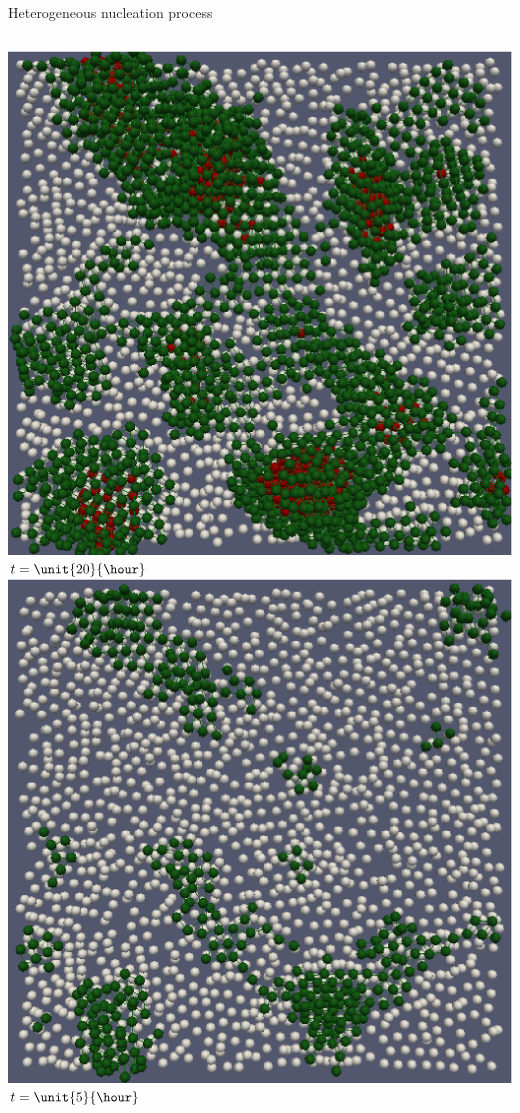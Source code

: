 \begin{frame}{Heterogeneous nucleation process}
\begin{columns}
	\bigskip\includegraphics[width=\columnwidth]{X_t100}\\
	$t=\unit{20}{\hour}$
	\includegraphics[width=\columnwidth]{X_t025}\\
	$t=\unit{5}{\hour}$
	

\end{columns}
\end{frame}

